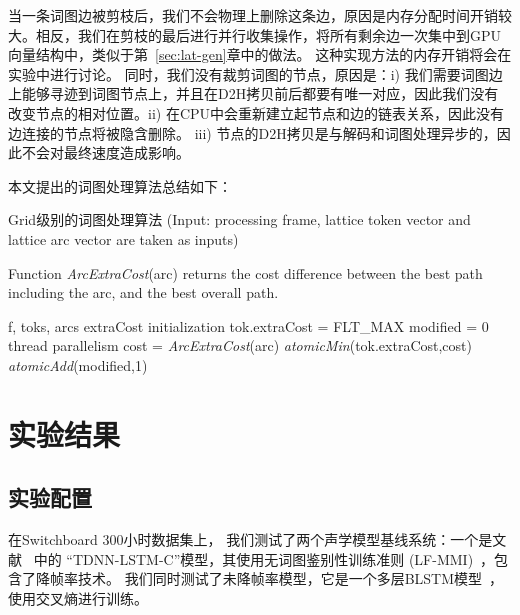  当一条词图边被剪枝后，我们不会物理上删除这条边，原因是内存分配时间开销较大。相反，我们在剪枝的最后进行并行收集操作，将所有剩余边一次集中到GPU向量结构中，类似于第~\ref{sec:lat-gen}章中的做法。 这种实现方法的内存开销将会在实验中进行讨论。
同时，我们没有裁剪词图的节点，原因是：i) 我们需要词图边上能够寻迹到词图节点上，并且在D2H拷贝前后都要有唯一对应，因此我们没有改变节点的相对位置。ii) 在CPU中会重新建立起节点和边的链表关系，因此没有边连接的节点将被隐含删除。 iii)  节点的D2H拷贝是与解码和词图处理异步的，因此不会对最终速度造成影响。

本文提出的词图处理算法总结如下：
 \vspace{-0.25em}
 \begin{algorithm}[ht]
 \caption{Grid级别的词图处理算法  \textcolor[rgb]{0,0.5,0}{(Input: processing frame, lattice token vector and lattice arc vector are taken as inputs)}}
 \label{code:exact-lattice}
 \begin{flushleft}
 Function {\em{ArcExtraCost}}(arc) returns the cost difference between the best path including the arc, and the best overall path.
 \end{flushleft}
 \begin{algorithmic}[1]
  {f, toks, arcs}
  \Comment \textcolor[rgb]{0.8,0,0}{extraCost initialization}
 \State tok.extraCost = FLT\_MAX
 \EndFor
 \State  modified = 0
  \Comment \textcolor[rgb]{0.8,0,0}{thread parallelism }
 \State cost = \textit{ArcExtraCost}(arc)
 \State \textit{atomicMin}(tok.extraCost,cost)
 \State \textit{atomicAdd}(modified,1)
 \EndIf
 \EndFor
 \EndWhile
 \EndProcedure
 \end{algorithmic}
 \end{algorithm}

\section{实验结果}
\label{chap:gpu-exp}

\subsection{实验配置}
在Switchboard 300小时数据集上，
我们测试了两个声学模型基线系统：一个是文献 ~\cite{peddinti2018low}中的 ``TDNN-LSTM-C''模型，其使用无词图鉴别性训练准则 (LF-MMI)~\cite{povey2016purely}，包含了降帧率技术。
我们同时测试了未降帧率模型，它是一个多层BLSTM模型~\cite{sak2014long}，使用交叉熵进行训练。%


